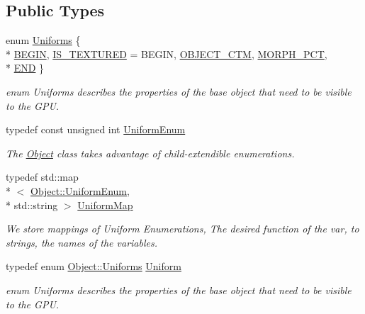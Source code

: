 \subsection*{Public Types}
\begin{DoxyCompactItemize}
\item 
enum \hyperlink{class_object_a8c11d8700b0bb79a46c61f2de4f23fa3}{Uniforms} \{ \\*
\hyperlink{class_object_a8c11d8700b0bb79a46c61f2de4f23fa3a8a65225741e4db1df295c9cab71a98c0}{B\-E\-G\-I\-N}, 
\hyperlink{class_object_a8c11d8700b0bb79a46c61f2de4f23fa3a8fecaee23530c9befe7feb5166e81484}{I\-S\-\_\-\-T\-E\-X\-T\-U\-R\-E\-D} = B\-E\-G\-I\-N, 
\hyperlink{class_object_a8c11d8700b0bb79a46c61f2de4f23fa3a9aaf45d5144b52065016b5b39e909851}{O\-B\-J\-E\-C\-T\-\_\-\-C\-T\-M}, 
\hyperlink{class_object_a8c11d8700b0bb79a46c61f2de4f23fa3ac93e286d52dad730ccf3fdab9b102902}{M\-O\-R\-P\-H\-\_\-\-P\-C\-T}, 
\\*
\hyperlink{class_object_a8c11d8700b0bb79a46c61f2de4f23fa3ad78facbf844c1259f464a49061e1d7ed}{E\-N\-D}
 \}
\begin{DoxyCompactList}\small\item\em enum Uniforms describes the properties of the base object that need to be visible to the G\-P\-U. \end{DoxyCompactList}\item 
typedef const unsigned int \hyperlink{class_object_a79b74057dbc5182b85c9c3ba8480fcf2}{Uniform\-Enum}
\begin{DoxyCompactList}\small\item\em The \hyperlink{class_object}{Object} class takes advantage of child-\/extendible enumerations. \end{DoxyCompactList}\item 
typedef std\-::map\\*
$<$ \hyperlink{class_object_a79b74057dbc5182b85c9c3ba8480fcf2}{Object\-::\-Uniform\-Enum}, \\*
std\-::string $>$ \hyperlink{class_object_a6e19bd8516360bff956408cbae33b878}{Uniform\-Map}
\begin{DoxyCompactList}\small\item\em We store mappings of Uniform Enumerations, The desired function of the var, to strings, the names of the variables. \end{DoxyCompactList}\item 
typedef enum \hyperlink{class_object_a8c11d8700b0bb79a46c61f2de4f23fa3}{Object\-::\-Uniforms} \hyperlink{class_object_ae6a2969ddca87d2c54b7cb1c131a7d60}{Uniform}
\begin{DoxyCompactList}\small\item\em enum Uniforms describes the properties of the base object that need to be visible to the G\-P\-U. \end{DoxyCompactList}\end{DoxyCompactItemize}
